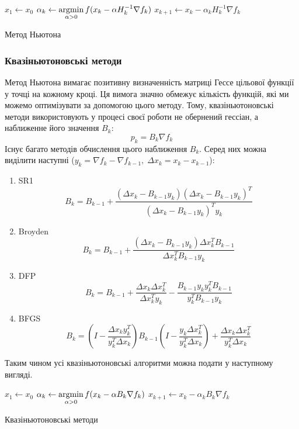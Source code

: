 \begin{algorithm}[H] \label{alg:newton}
    \SetAlgoLined
    $x_1 \leftarrow x_0$\;
    {
        $\alpha_k \leftarrow \mathop{\mathrm{argmin}}\limits_{\alpha > 0} f(x_{k} - \alpha H^{-1}_k \nabla f_{k})$\;
        $x_{k+1} \leftarrow x_{k} - \alpha_k H^{-1}_k \nabla f_{k}$\;
    }
    \caption{Метод Ньютона}
\end{algorithm}

\subsubsection*{Квазіньютоновські методи}

Метод Ньютона вимагає позитивну визначенність матриці Гессе
цільової функції у точці на кожному кроці. Ця вимога значно обмежує
кількість функцій, які ми можемо оптимізувати за допомогою
цього методу. Тому, квазіньютоновські методи використовують
у процесі своєї роботи не обернений гессіан,
а наближенне його значення $B_k$:
\begin{equation}
    p_k = B_k \nabla f_k
\end{equation}
Існує багато методів обчислення цього наближення $B_k$.
Серед них можна виділити наступні
($y_k = \nabla f_k - \nabla f_{k-1}, \;
\Delta x_k = x_k - x_{k-1} $):
\begin{enumerate}
    \item SR1
    $$ B_k = B_{k-1} + \frac{(\Delta x_{k} - B_{k-1}y_k)
    (\Delta x_{k} - B_{k-1}y_k)^{T}}
    {(\Delta x_{k} - B_{k-1}y_k)^{T}y_k} $$
    \item Broyden
    $$ B_k = B_{k-1} + \frac{(\Delta x_{k} - B_{k-1}y_k)
    \Delta x_{k}^{T}B_{k-1}}
    {\Delta x_{k}^{T}B_{k-1}y_k} $$
    \item DFP
    $$ B_k = B_{k-1} + \frac{\Delta x_{k}\Delta x_{k}^{T}}
    {\Delta x_{k}^{T}y_k} - \frac{B_{k-1}y_ky_k^{T}B_{k-1}}{y_k^{T}B_{k-1}y_k} $$
    \item BFGS
    $$ B_k = \left( I - \frac{\Delta x_{k}y_k^{T}}{y_k^{T}\Delta x_k} \right) B_{k-1}
    \left( I - \frac{y_k \Delta x_{k}^{T}}{y_k^{T}\Delta x_k} \right) +
    \frac{\Delta x_{k}\Delta x_{k}^{T}}{y_k^{T}\Delta x_k}
     $$
\end{enumerate}

Таким чином усі квазіньютоновські алгоритми можна подати у наступному
вигляді.

\begin{algorithm}[H] \label{alg:newton}
    \SetAlgoLined
    $x_1 \leftarrow x_0$\;
    {
        $\alpha_k \leftarrow \mathop{\mathrm{argmin}}\limits_{\alpha > 0} f(x_{k} - \alpha B_k \nabla f_{k})$\;
        $x_{k+1} \leftarrow x_{k} - \alpha_k B_k \nabla f_{k}$\;
    }
    \caption{Квазіньютоновські методи}
\end{algorithm}

